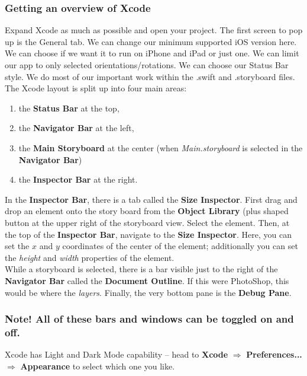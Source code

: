 \documentclass[12pt, letterpaper]{article}
\begin{document}
\subsubsection*{Getting an overview of Xcode}

Expand Xcode as much as possible and open your project. The first screen to pop up is the General tab.
We can change our minimum supported iOS version here. We can choose if we want it to run on iPhone
and iPad or just one. We can limit our app to only selected orientations/rotations. We can choose
our Status Bar style. We do most of our important work within the .swift and .storyboard files. \\

The Xcode layout is split up into four main  areas: 
\begin{enumerate}
    \itemsep0em
    \item{the \textbf{ Status Bar} at the top,} 
    \item{the \textbf{Navigator Bar} at the left,}
    \item{the \textbf{Main Storyboard} at the center (when \emph{Main.storyboard} is selected in the
        \textbf{Navigator Bar})}
    \item{the \textbf{Inspector Bar} at the right.}
\end{enumerate}

In the \textbf{Inspector Bar}, there is a tab called the \textbf{Size Inspector}. First drag and drop an
element onto the story board from the \textbf{Object Library} (plus shaped button at the upper
right of the storyboard view. Select the element. Then, at the top of the \textbf{Inspector Bar}, 
navigate to the \textbf{Size Inspector}. Here, you can set the $x$ and $y$ coordinates of the center
of the element; additionally you can set the \emph{height} and \emph{ width} properties 
of the element. \\

While a storyboard is selected, there is a bar visible just to the right of the \textbf{Navigator Bar} 
called the \textbf{Document Outline}. If this were PhotoShop, this would be where the \emph{layers}.
Finally, the very bottom pane is the \textbf{Debug Pane}.

\subsubsection*{Note! All of these bars and windows can be toggled on and off.}

Xcode has Light and Dark Mode capability -- head to  \textbf{Xcode} $\Rightarrow$ \textbf{Preferences...}
$\Rightarrow$ \textbf{Appearance} to select which one you like.
\end{document}
